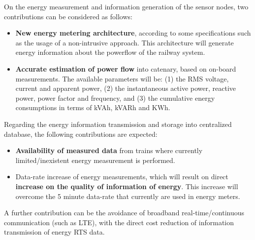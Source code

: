 On the energy measurement and information generation of the sensor nodes, two contributions can be considered as follows:

\begin{itemize}
	\setlength\itemsep{0em}
	
	\item \textbf{New energy metering architecture}, according to some specifications such as the usage of a non-intrusive approach.
	This architecture will generate energy information about the powerflow of the railway system.
	
	\item \textbf{Accurate estimation of power flow} into catenary, based on on-board measurements. The available parameters will be: (1) the RMS voltage, current and apparent power, (2) the instantaneous active power, reactive power, power factor and frequency, and (3) the cumulative energy consumptions in terms of kVAh, kVARh and KWh.
	
	
\end{itemize}


Regarding the energy information transmission and storage into centralized database, the following contributions are expected:


\begin{itemize}
	\setlength\itemsep{0em}
	
	\item \textbf{Availability of measured data} from trains where currently limited/inexistent energy measurement is performed.
	
	\item Data-rate increase of energy measurements, which will result on direct \textbf{increase on the quality of information of energy}. This increase will overcome the 5 minute data-rate that currently are used in energy meters.

	
	
\end{itemize}

A further contribution can be the avoidance of broadband real-time/continuous communication (such as \ac{LTE}), with the direct cost reduction of information transmission of energy \ac{RTS} data.

